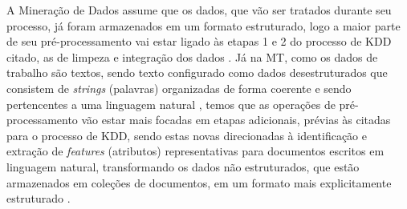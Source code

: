    A Mineração de Dados assume que os dados, que vão ser tratados durante seu processo, já foram armazenados em um formato estruturado, logo a maior parte de seu pré-processamento vai estar ligado às etapas 1 e 2 do processo de KDD citado, as de limpeza e integração dos dados \cite[p.~1]{Feldman:2006:TMH:1076381}. %
    Já na MT, como os dados de trabalho são textos, sendo texto configurado como dados desestruturados que consistem de \textit{strings} (palavras) organizadas de forma coerente e sendo pertencentes a uma linguagem natural \cite[p.~1]{Jo2018TMCIBDC}, temos que as operações de pré-processamento vão estar mais focadas em etapas adicionais, prévias às citadas para o processo de KDD, sendo estas novas direcionadas à identificação e extração de \textit{features} (atributos) representativas para documentos escritos em linguagem natural, transformando os dados não estruturados, que estão armazenados em coleções de documentos, em um formato mais explicitamente estruturado \cite[p.~1]{Feldman:2006:TMH:1076381}.
    

    
    
    
